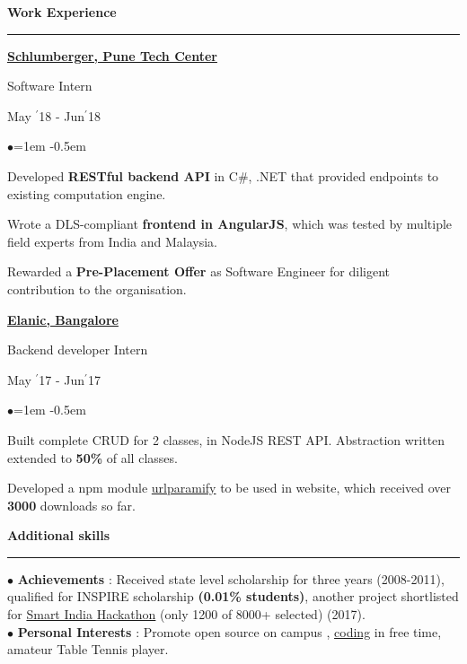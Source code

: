 \documentclass[11pt, a4paper]{resume}
\newcommand{\important}[1]{
	\textcolor{mypurple}{#1}
}
\newcommand{\sectionTitle}[1]{
	\begin{Large}
    	\important{\textbf{#1}}
    \end{Large}
    \important{\noindent\rule{17cm}{0.4pt}} \newline
}
\newcommand\textbox[1]{
  \parbox{.333\textwidth}{#1}
}
\newenvironment{Jobsection}[3]{ %
\noindent\textbox{\bf #1\hfill}\textbox{\hfil #2\hfil}\textbox{\hfill #3}
  \begin{list}{$\bullet$}{\leftmargin=1em} %
   \itemsep -0.5em \vspace{-0.5em} %
  }{
  \end{list}
  \vspace{0.5em} %
}
\begin{document}
\sectionTitle{Work Experience}
\begin{Jobsection}{\href{https://drive.google.com/file/d/1EcfIC_g8bx3whaxMdOkFyZx4TCqA1RAq/view?usp=sharing}{Schlumberger, 
Pune Tech Center}}{Software Intern}{ May $^{\prime}$18 - Jun$^{\prime}$18}
\item Developed {\bf RESTful backend API} in C\#, .NET that provided endpoints to existing 
computation engine.
\item Wrote a DLS-compliant {\bf frontend in AngularJS}, which was tested  by multiple field 
experts from India and Malaysia.
\item Rewarded a {\bf Pre-Placement Offer} as Software Engineer for diligent contribution to 
the organisation.
\end{Jobsection}

\begin{Jobsection}{\href{https://drive.google.com/file/d/0B5iU6cWw36rOVWZIcllPY3RSd2c/view?usp=sharing}{Elanic, 
Bangalore}}{Backend developer Intern}{ May $^{\prime}$17 - Jun$^{\prime}$17}
\item Built complete CRUD for 2 classes, in NodeJS REST API. Abstraction written extended to 
{\bf 50\%} of all classes.
\item Developed a npm module \href{https://www.npmjs.com/package/urlparamify}{urlparamify} 
to be used in website, which received over {\bf 3000} downloads so far.
\end{Jobsection}

\sectionTitle{Additional skills}
$\bullet$ {\bf Achievements} : Received state level scholarship for three years (2008-2011), 
qualified for INSPIRE scholarship {\bf (0.01\% students)}, another project shortlisted for 
\href{https://drive.google.com/file/d/0B5iU6cWw36rOamZLWHZENWdlY0k/view?usp=sharing}{Smart 
India Hackathon} (only 1200 of 8000+ selected) (2017).\\
$\bullet$ {\bf Personal Interests} : Promote open source on campus , 
\href{http://github.com/kaustubhhiware}{coding} in free time, amateur Table Tennis player.
\end{document}
